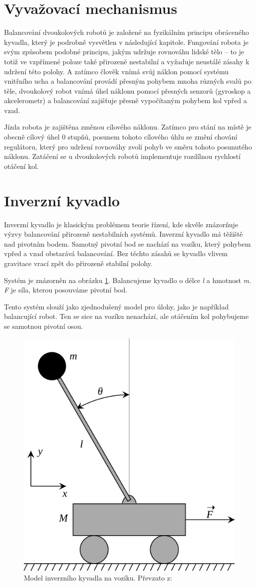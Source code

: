 \section{Vyvažovací mechanismus}
Balancování dvoukolových robotů je založené na fyzikálním principu obráceného kyvadla, který je podrobně vysvětlen v následující kapitole. Fungování robota je svým způsobem podobné principu, jakým udržuje rovnováhu lidské tělo – to je totiž ve vzpřímené poloze také přirozeně nestabilní a vyžaduje neustálé zásahy k udržení této polohy. A zatímco člověk vnímá svůj náklon pomocí systému vnitřního ucha a balancování provádí přesným pohybem mnoha různých svalů po těle, dvoukolový robot vnímá úhel náklonu pomocí přesných senzorů (gyroskop a akcelerometr) a balancování zajišťuje přesně vypočítaným pohybem kol vpřed a vzad. 

Jízda robota je zajištěna změnou cílového náklonu. Zatímco pro stání na místě je obecně cílový úhel 0 stupňů, posunem tohoto cílového úhlu se změní chování regulátoru, který pro udržení rovnováhy zvolí pohyb ve směru tohoto posunutého náklonu. Zatáčení se u dvoukolových robotů implementuje rozdílnou rychlostí otáčení kol.

\section{Inverzní kyvadlo}
Inverzní kyvadlo je klasickým problémem teorie řízení, kde skvěle znázorňuje výzvy balancování přirozeně nestabilních systémů. Inverzní kyvadlo má těžiště nad pivotním bodem. Samotný pivotní bod se nachází na vozíku, který pohybem vpřed a vzad obstarává balancování. Bez těchto zásahů se kyvadlo vlivem gravitace vrací zpět do přirozeně stabilní polohy. 

Systém je znázorněn na obrázku \ref{kyvadlo}. Balancujeme kyvadlo o délce {\it l} a hmotnost {\it m}. {\it F} je síla, kterou posouváme pivotní bod.

Tento systém slouží jako zjednodušený model pro úlohy, jako je například balancující robot. Ten se sice na vozíku nenachází, ale otáčením kol pohybujeme se samotnou pivotní osou.

\begin{figure}
    \centering
    \includegraphics[width=0.5\linewidth]{obrazky-figures/512px-Cart-pendulum.svg.png}
    \caption{Model inverzního kyvadla na vozíku. Převzato z: \cite{kyvadlo_img}}
    \label{kyvadlo}
\end{figure}


